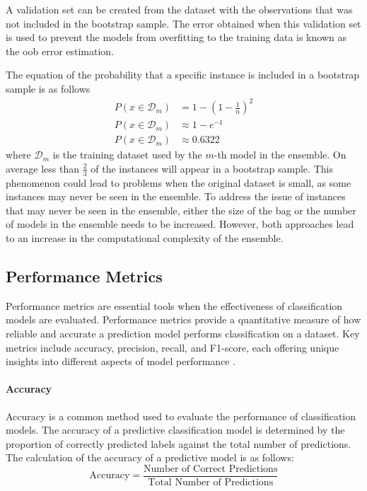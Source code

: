 \documentclass[10pt, conference]{IEEEtran}
\begin{document}
A validation set can be created from the dataset with the observations that was not included
in the bootstrap sample. The error obtained when this validation set is used to prevent the
models from overfitting to the training data is known as the \acrfull{oob} error estimation.

The equation of the probability that a specific instance is included in a bootstrap sample is as follows
\begin{align*}
    P(x \in \mathcal{D}_m) &= 1 - \left(1 - \frac{1}{n}\right)^2 \\
    P(x \in \mathcal{D}_m) &\approx 1 - e^{-1} \\
    P(x \in \mathcal{D}_m) &\approx 0.6322 \tag{10}
\end{align*}
where $\mathcal{D}_m$ is the training dataset used by the $m$-th model in the ensemble.
On average less than $\frac{2}{3}$ of the instances will appear in a bootstrap sample.
This phenomenon could lead to problems when the original dataset is small, as some instances
may never be seen in the ensemble. To address the issue of instances that may never be seen in the ensemble,
either the size of the bag or the number of models in the ensemble needs to be increased.
However, both approaches lead to an increase in the computational complexity of the ensemble.

\subsection{Performance Metrics} \label{section: Perf_Metrics_background}

Performance metrics are essential tools when the effectiveness of classification models are evaluated. Performance metrics
provide a quantitative measure of how reliable and accurate a prediction model performs classification on a dataset.
Key metrics include accuracy, precision, recall, and F1-score, each offering unique insights into different aspects
of model performance \cite{Performance_ref}.

\paragraph{Accuracy}
Accuracy is a common method used to evaluate the performance of classification models. The accuracy of
a predictive classification model is determined by the proportion of correctly predicted labels against
the total number of predictions. The calculation of the accuracy of a predictive model is as follows:
\begin{equation}
    \text{Accuracy} = \frac{\text{Number of Correct Predictions}}{\text{Total Number of Predictions}} \label{accuracy}
\end{equation}
\end{document}
